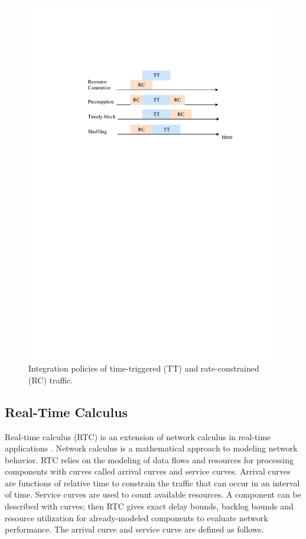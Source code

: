 \documentclass[electronics,article,accept,moreauthors,pdftex]{Definitions/mdpi}
\begin{document}
\begin{figure}[H]
\centering
\includegraphics [scale=0.65] {figures/intergration}
\caption{Integration policies of time-triggered (TT) and rate-constrained (RC) traffic.}
\label{inter}
\end{figure}

\subsection{Real-Time Calculus}

Real-time calculus (RTC) is an extension of network calculus in real-time applications \cite{thiele2000real}. Network calculus \cite{le2001network} is a mathematical approach to modeling network behavior. RTC relies on the modeling of data flows and resources for processing components with curves called arrival curves and service curves. Arrival curves are functions of relative time to constrain the traffic that can occur in an interval of time. Service curves are used to count available resources. A component can be described with curves; then RTC gives exact delay bounds, backlog bounds and resource utilization for already-modeled components to evaluate network performance. The arrival curve and service curve are defined as follows.
\end{document}
